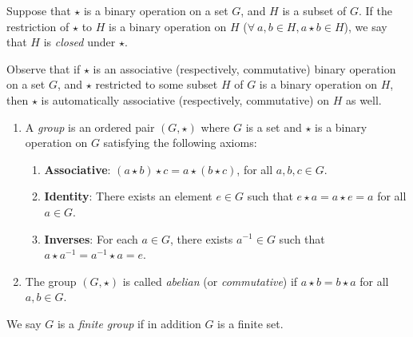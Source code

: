 Suppose that $\star$ is a binary operation on a set $G$, and $H$ is a subset of $G$.
If the restriction of $\star$ to $H$ is a binary operation on $H$ ($\forall\ a,b\in H, a\star b\in H$), we say that $H$ is {\sl closed} under $\star$.

Observe that if $\star$ is an associative (respectively, commutative) binary operation on a set $G$,
and $\star$ restricted to some subset $H$ of $G$ is a binary operation on $H$,
then $\star$ is automatically associative (respectively, commutative) on $H$ as well.
\newpage
\thispagestyle{oddpagestyle}
{
\begin{enumerate}[leftmargin=20pt, itemsep=0pt, topsep=3pt]
    \item A {\sl group} is an ordered pair $(G,\star)$ where $G$ is a set and
    $\star$ is a binary operation on $G$ satisfying the following axioms:
    \begin{enumerate}[leftmargin=20pt, itemsep=0pt, topsep=0pt, label=(\roman*)]
        \item {\bf Associative}: $(a\star b)\star c = a\star (b\star c)$, for all $a,b,c\in G$.
        \item {\bf Identity}: There exists an element $e\in G$ such that
        $e\star a = a\star e = a$ for all $a\in G$.
        \item {\bf Inverses}: For each $a\in G$, there exists $a^{-1}\in G$ such that
        $a\star a^{-1} = a^{-1}\star a = e$.
    \end{enumerate}
    \item The group $(G,\star)$ is called {\sl abelian} (or {\sl commutative}) if $a\star b = b\star a$ for all $a,b\in G$.
\end{enumerate}
}
We say $G$ is a {\sl finite group} if in addition $G$ is a finite set.

